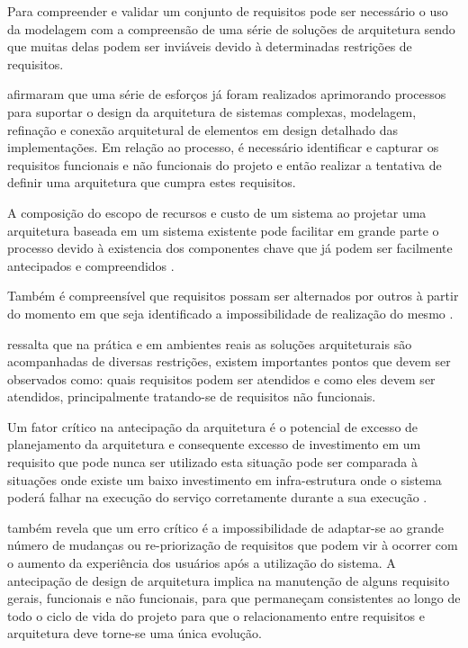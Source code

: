 \cite{babar2013agile} Para compreender e validar um conjunto de requisitos pode ser necessário o uso da modelagem com a compreensão de uma série de soluções de arquitetura sendo que muitas delas podem ser inviáveis devido à determinadas restrições de requisitos. 

\cite{hanschke2015integrating} afirmaram que uma série de esforços já foram realizados aprimorando processos para suportar o design da arquitetura de sistemas complexas, modelagem, refinação e conexão arquitetural de elementos em design detalhado das implementações.  Em relação ao processo, é necessário identificar e capturar os requisitos funcionais e não funcionais do projeto e então realizar a tentativa de definir uma arquitetura que cumpra estes requisitos.

A composição do escopo de recursos e custo de um sistema ao projetar uma arquitetura baseada em um sistema existente pode facilitar em grande parte o processo devido à existencia dos componentes chave que já podem ser facilmente antecipados e compreendidos \cite{babar2013agile}.

Também é compreensível que requisitos possam ser alternados por outros à partir do momento em que seja identificado a impossibilidade de realização do mesmo  \cite{babar2013agile}.  

\cite{hanschke2015integrating} ressalta que na prática e em ambientes reais as soluções arquiteturais são acompanhadas de diversas restrições, existem importantes pontos que devem ser observados como: quais requisitos podem ser atendidos e como eles devem ser atendidos, principalmente tratando-se de requisitos não funcionais.

Um fator crítico na antecipação da arquitetura é o potencial de excesso de planejamento da arquitetura e consequente excesso de investimento em um requisito que pode nunca ser utilizado esta situação pode ser comparada à situações onde existe um baixo investimento em infra-estrutura onde o sistema poderá falhar na execução do serviço corretamente durante a sua execução \cite{grundy2012guest}. 


\cite{beck2001manifesto} também revela que um erro crítico é a impossibilidade de adaptar-se ao grande número de mudanças ou re-priorização de requisitos que podem vir à ocorrer com o aumento da experiência dos usuários após a utilização do sistema. A antecipação de design de arquitetura implica na manutenção de alguns requisito gerais, funcionais e não funcionais, para que permaneçam consistentes ao longo de todo o ciclo de vida do projeto para que o relacionamento entre requisitos e arquitetura deve torne-se uma única evolução. 


